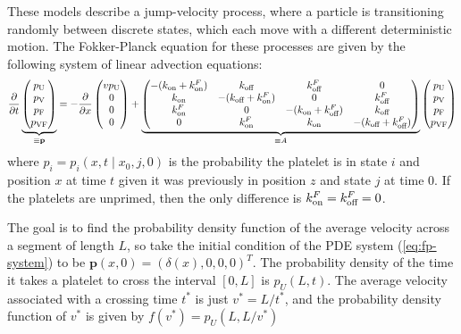 \documentclass{article}
\newcommand{\tn}{\textnormal}
\newcommand{\Pder}[2]{\frac{\partial #1}{\partial #2}}
\begin{document}
These models describe a jump-velocity process, where a particle is
transitioning randomly between discrete states, which each move with a
different deterministic motion. The Fokker-Planck equation for these
processes are given by the following system of linear advection
equations:
\begin{equation}
  \label{eq:fp-system}
  \Pder{}{t}
  \underbrace{
    \begin{pmatrix}
      p_\tn{U} \\ p_\tn{V} \\ p_\tn{F} \\ p_\tn{VF}
    \end{pmatrix}}_{\equiv \mathbf{p}}
  =
  -\Pder{}{x}
  \begin{pmatrix}
    v p_\tn{U} \\ 0 \\ 0 \\ 0
  \end{pmatrix}
  +
  \underbrace{
  \begin{pmatrix}
    -(k_\tn{on} + k_\tn{on}^F) & k_\tn{off} & k_\tn{off}^F & 0 \\
    k_\tn{on} & -(k_\tn{off} + k_\tn{on}^F) & 0 & k_\tn{off}^F \\
    k_\tn{on}^F & 0 & -(k_\tn{on} + k_\tn{off}^F) & k_\tn{off} \\
    0 & k_\tn{on}^F & k_\tn{on} & -(k_\tn{off} + k_\tn{off}^F)
  \end{pmatrix}}_{\equiv A}
  \begin{pmatrix}
    p_\tn{U} \\ p_\tn{V} \\ p_\tn{F} \\ p_\tn{VF}
  \end{pmatrix}
\end{equation}
where $p_i = p_i(x, t \mid x_0, j, 0)$ is the probability the platelet
is in state $i$ and position $x$ at time $t$ given it was previously
in position $z$ and state $j$ at time $0$. If the platelets are
unprimed, then the only difference is $k_\tn{on}^F = k_\tn{off}^F =
0$.

The goal is to find the probability density function of the average
velocity across a segment of length $L$, so take the initial condition
of the PDE system (\ref{eq:fp-system}) to be $\mathbf{p}(x, 0) =
(\delta(x), 0, 0, 0)^T$. The probability density of the time it takes
a platelet to cross the interval $[0, L]$ is $p_U(L, t)$. The average
velocity associated with a crossing time $t^*$ is just
$v^* = L/t^*$, and the probability density function
of $v^*$ is given by $f(v^*) = p_U(L, L/v^*)$
\end{document}
